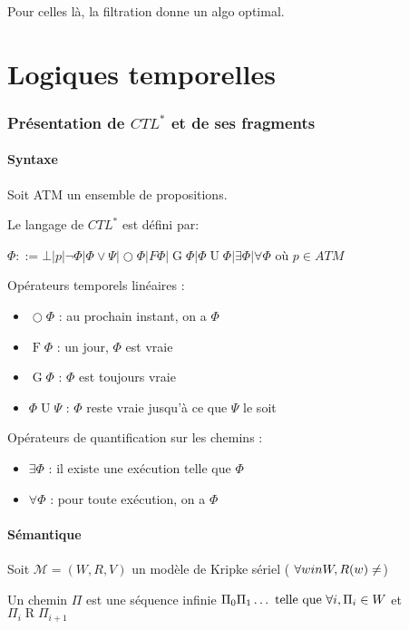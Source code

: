 \documentclass[10pt,a4paper]{article}
\newcommand{\M}{\mathcal{M}}
\DeclareMathOperator{\Ro}{R}
\DeclareMathOperator{\Oo}{\bigcirc}
\DeclareMathOperator{\Fo}{F}
\DeclareMathOperator{\Go}{G}
\DeclareMathOperator{\Uo}{U}
\begin{document}
Pour celles là, la filtration donne un algo optimal.
 

\part{Logiques temporelles}

\section{Présentation de $CTL^*$ et de ses fragments}
\subsection{Syntaxe}

Soit ATM un ensemble de propositions.

Le langage de $CTL^*$ est défini par:

$\Phi ::= \bot  |  p  |  \lnot \Phi  |  \Phi \vee \Psi  |   \Oo \Phi  |  F \Phi  |  \Go \Phi  |  \Phi \Uo \Phi  |  \exists \Phi  |  \forall \Phi$ où $p \in ATM$

Opérateurs temporels linéaires :
\begin{itemize}
 \item $ \Oo \Phi$ : au prochain instant, on a $\Phi$
 \item  $\Fo \Phi$ : un jour, $\Phi$ est vraie
 \item $\Go \Phi$ : $\Phi$ est toujours vraie
 \item $\Phi \Uo \Psi$ : $\Phi$ reste vraie jusqu'à ce que $\Psi$ le soit
\end{itemize}

Opérateurs de quantification sur les chemins : 
\begin{itemize}
 \item $\exists \Phi$ : il existe une exécution telle que $\Phi$
 \item $\forall \Phi$ : pour toute exécution, on a $\Phi$
\end{itemize}

\subsection{Sémantique}
Soit $\M = (W,R,V)$ un modèle de Kripke sériel ( $\forall w in W, R(w) \not = \empty$)

Un chemin $\Pi$ est une séquence infinie $\Pi_0 \Pi_1 \dots \tq[le] \forall i, \Pi_i \in W$ et $\Pi_i   \Ro \Pi_{i+1}$
\end{document}
